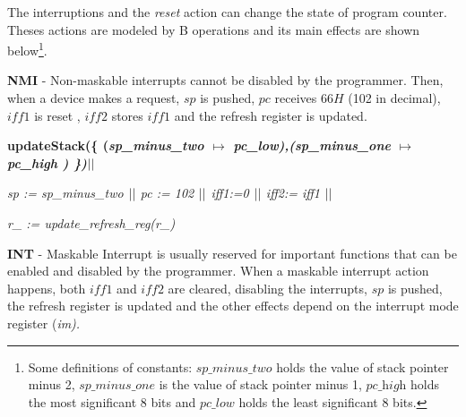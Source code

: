 \documentclass[a4paper]{llncs}
\begin{document}
The interruptions and the \textit{reset} action can change the state of
program counter. Theses actions are modeled by B operations and its main
effects are shown below\footnote{Some definitions of constants: $\textit{sp\_minus\_two}$ holds the value of stack pointer minus 2,
 $\textit{sp\_minus\_one}$ is the value of stack pointer minus 1,
$\textit{pc\_high}$ holds the most significant 8 bits and
$\textit{pc\_low}$ holds the least significant 8 bits.}.


 \textbf{NMI} - Non-maskable interrupts cannot be disabled
 by the programmer. Then, when a device makes a request, $sp$ is pushed,
 $pc$ receives $66H$ (102 in decimal), $\textit{iff1}$ is reset , $\textit{iff2}$ stores
 $\textit{iff1}$ and the refresh register is updated.
  
\begin{sloppypar}
\bf updateStack\rm (\rm \{ \rm (\it sp\_minus\_two  $\mapsto$  \it pc\_low\rm )\rm ,\rm (\it sp\_minus\_one  $\mapsto$ \it pc\_high \rm ) \rm \}\rm )$\mbox{$\mid\mid$}$

\it sp \rm := \it sp\_minus\_two  $\mbox{$\mid\mid$}$ \it pc \rm := \rm 1\rm 0\rm 2 $\mbox{$\mid\mid$}$ \it iff1\rm :=\rm 0  $\mbox{$\mid\mid$}$  \it iff2\rm := \it iff1 $\mbox{$\mid\mid$}$

\it r\_ \rm := \it update\_refresh\_reg\rm (\it r\_\rm )\\
\end{sloppypar}

  \textbf{INT} - Maskable Interrupt is usually reserved for important functions that can be enabled and
  disabled by the programmer. When a maskable interrupt action happens, both $\textit{iff1}$ and $\textit{iff2}$ are
  cleared, disabling the interrupts, $sp$ is pushed, the refresh register is updated and the other effects
  depend on the interrupt mode register (\it im\rm).
 
\end{document}
